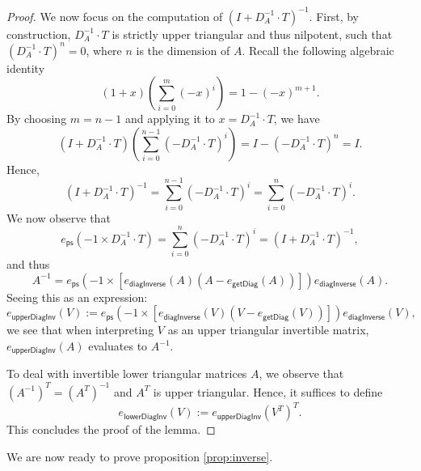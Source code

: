 \begin{proof}
    We now focus on the computation of $\left( I+D_A^{-1}\cdot T\right)^{-1}$. First, by construction, $D_A^{-1}\cdot T$ is strictly upper triangular and thus nilpotent, 
    such that $\left( D_A^{-1}\cdot T\right)^n=0$, where $n$ is the dimension of $A$.
    Recall the following algebraic identity 
    $$(1+x)\left( \sum_{i=0}^{m}(-x)^i \right)=1-(-x)^{m+1}.$$
    By choosing $m=n-1$ and applying it to $x=D_A^{-1}\cdot T$, we have
    $$
    \left(I+D_A^{-1}\cdot T \right)\left( \sum_{i=0}^{n-1}(-D_A^{-1}\cdot T)^i \right)=I- \left( -D_A^{-1}\cdot T\right)^n =I.
    $$
    Hence,
    $$
    \left(I+D_A^{-1}\cdot T \right)^{-1}=\sum_{i=0}^{n-1}(-D_A^{-1}\cdot T)^i=\sum_{i=0}^{n}(-D_A^{-1}\cdot T)^i.
    $$
    We now observe that
    $$
    e_{\mathsf{ps}}(-1\times D_A^{-1}\cdot T)=\sum_{i=0}^{n}(-D_A^{-1}\cdot T)^i=\left(I+D_A^{-1}\cdot T \right)^{-1},
    $$
    and thus 
    $$
    A^{-1}= e_{\mathsf{ps}}\left(-1\times \left[e_{\mathsf{diagInverse}}(A)(A-e_{\mathsf{getDiag}}(A))\right] \right)e_{\mathsf{diagInverse}}(A).
    $$
    Seeing this as an expression:
    $$
    e_{\mathsf{upperDiagInv}}(V):= e_{\mathsf{ps}}\left(-1\times \left[e_{\mathsf{diagInverse}}(V)(V-e_{\mathsf{getDiag}}(V))\right] \right)e_{\mathsf{diagInverse}}(V),
    $$
    we see that  when interpreting $V$ as an  upper triangular invertible matrix, 
    $e_{\mathsf{upperDiagInv}}(A)$ evaluates to $A^{-1}$.


    To deal with invertible lower triangular matrices $A$, we observe that  $\left(A^{-1}\right)^T=\left(A^T\right)^{-1}$ and $A^T$ is upper triangular.
    Hence, it suffices to define
    $$
    e_{\mathsf{lowerDiagInv}}(V):= e_{\mathsf{upperDiagInv}}(V^T)^T.
    $$
    This concludes the proof of the lemma.
\end{proof}

We are now ready to prove proposition \ref{prop:inverse}.

